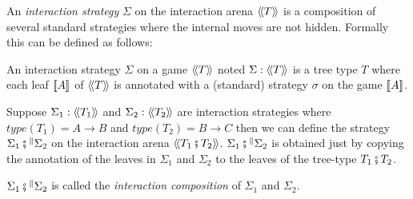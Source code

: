 


An \emph{interaction strategy} $\Sigma$ on the interaction arena
${\langle\!\langle T \rangle\!\rangle}$ is a composition of several standard strategies where
the internal moves are not hidden. Formally this can be defined as
follows:
\begin{dfn}
An interaction strategy $\Sigma$ on a game ${\langle\!\langle T \rangle\!\rangle}$ noted
$\Sigma: {\langle\!\langle T \rangle\!\rangle}$ is a tree type $T$ where each leaf ${[\![ A ]\!]}$ of
${\langle\!\langle T \rangle\!\rangle}$ is annotated with a (standard) strategy $\sigma$ on the
game ${[\![ A ]\!]}$.
\end{dfn}


\begin{dfn}
Suppose $\Sigma_1 : {\langle\!\langle T_1 \rangle\!\rangle}$ and $\Sigma_2 :
{\langle\!\langle T_2 \rangle\!\rangle}$ are interaction strategies where $type(T_1) = A \rightarrow B$
and $type(T_2) = B \rightarrow C$ then we
can define the strategy $\Sigma_1 \fatsemi{^\|} \Sigma_2$ on the interaction arena ${\langle\!\langle T_1 \fatsemi T_2 \rangle\!\rangle}$.
$\Sigma_1 \fatsemi{^\|} \Sigma_2$ is obtained just by copying the annotation of the leaves in $\Sigma_1$ and $\Sigma_2$
to the leaves of the tree-type $T_1 \fatsemi T_2$.

$\Sigma_1 \fatsemi{^\|} \Sigma_2$  is called the \emph{interaction composition} of $\Sigma_1$ and $\Sigma_2$.
\end{dfn}

